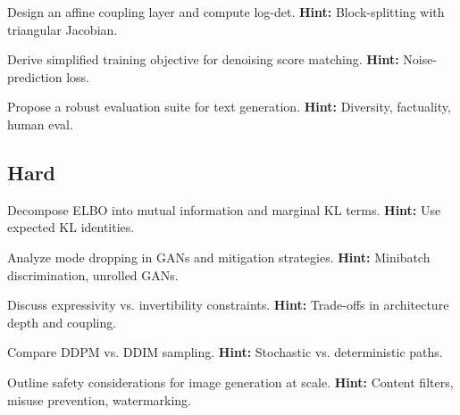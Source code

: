 \begin{problem}
Design an affine coupling layer and compute log-det.
\textbf{Hint:} Block-splitting with triangular Jacobian.
\end{problem}

\begin{problem}
Derive simplified training objective for denoising score matching.
\textbf{Hint:} Noise-prediction loss.
\end{problem}

\begin{problem}[Evaluation]
Propose a robust evaluation suite for text generation.
\textbf{Hint:} Diversity, factuality, human eval.
\end{problem}

\subsection*{Hard}
\begin{problem}
Decompose ELBO into mutual information and marginal KL terms.
\textbf{Hint:} Use expected KL identities.
\end{problem}

\begin{problem}
Analyze mode dropping in GANs and mitigation strategies.
\textbf{Hint:} Minibatch discrimination, unrolled GANs.
\end{problem}

\begin{problem}
Discuss expressivity vs. invertibility constraints.
\textbf{Hint:} Trade-offs in architecture depth and coupling.
\end{problem}

\begin{problem}
Compare DDPM vs. DDIM sampling.
\textbf{Hint:} Stochastic vs. deterministic paths.
\end{problem}

\begin{problem}[Safety]
Outline safety considerations for image generation at scale.
\textbf{Hint:} Content filters, misuse prevention, watermarking.
\end{problem}


